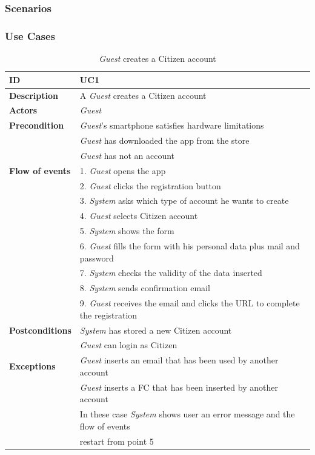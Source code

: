 \documentclass{article}
\begin{document}
\subsubsection{Scenarios}

\subsubsection{Use Cases}

\begin{table}
    \begin{center}
    \centering
\begin{tabular}{ | l | l |}
\hline
\textbf{ID} & UC1 \\
\hline
\textbf{Description} & A \textit{Guest} creates a Citizen account \\
\hline
\textbf{Actors} & \textit{Guest} \\
\hline
\textbf{Precondition} & \textit{Guest}'s smartphone satisfies hardware limitations \\
             & \textit{Guest} has downloaded the app from the store \\
             & \textit{Guest} has not an account\\ 
\hline
\textbf{Flow of events} & 1. \textit{Guest} opens the app \\
                        & 2. \textit{Guest} clicks the registration button \\
                        & 3. \textit{System} asks which type of account he wants to create \\
                        & 4. \textit{Guest} selects Citizen account \\
                        & 5. \textit{System} shows the form \\
                        & 6. \textit{Guest} fills the form with his personal data plus mail and password \\
                        & 7. \textit{System} checks the validity of the data inserted \\
                        & 8. \textit{System} sends confirmation email \\
                        & 9. \textit{Guest} receives the email and clicks the URL to complete the registration \\  
\hline
\textbf{Postconditions} & \textit{System} has stored a new Citizen account  \\
                        & \textit{Guest} can login as Citizen \\
\hline
\textbf{Exceptions} & \textit{Guest} inserts an email that has been used by another account \\
                    & \textit{Guest} inserts a FC that has been inserted by another account \\
                    & In these case \textit{System} shows user an error message and the flow of events  \\
                    & restart from point 5 \\  
\hline
\end{tabular}
\caption{\textit{Guest} creates a Citizen account}
\end{center}
\end{table}
\end{document}
